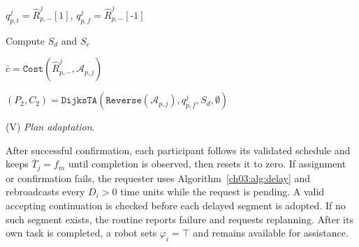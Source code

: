 \begin{algorithm}[t]
\caption{Evaluate the request, \texttt{EvalReq}($\cdot$)}
\label{ch03:adapt}
\DontPrintSemicolon


$q_{p,t}^j=\widehat{R}_{p,-}^j[1]$,
$q_{p,f}^j=\widehat{R}_{p,-}^j[\text{-1}]$\;

Compute $S_d$ and $S_c$\;

$\bar{c}=\texttt{Cost}(\widehat{R}_{p,-}^j,\mathcal{A}_{p,j})$\;

\;

$(P_2,C_2)=\texttt{DijksTA}
(\texttt{Reverse}(\mathcal{A}_{p,j}),q_{p,f}^j,S_d,\emptyset)$\;


\;


\;
\end{algorithm}

(V) \emph{Plan adaptation}.
\begin{revision}
After successful confirmation, each participant follows its validated schedule
and keeps $\overline{T}_j=f_m$ until completion is observed, then resets it to zero.
If assignment or confirmation fails, the requester uses
Algorithm~\ref{ch03:alg:delay} and rebroadcasts every $D_i>0$ time units
while the request is pending. A valid accepting continuation is checked before each delayed
segment is adopted. If no such segment exists, the routine reports failure
and requests replanning. After its own task is completed, a robot sets
$\varphi_i=\top$ and remains available for assistance.
\end{revision}

